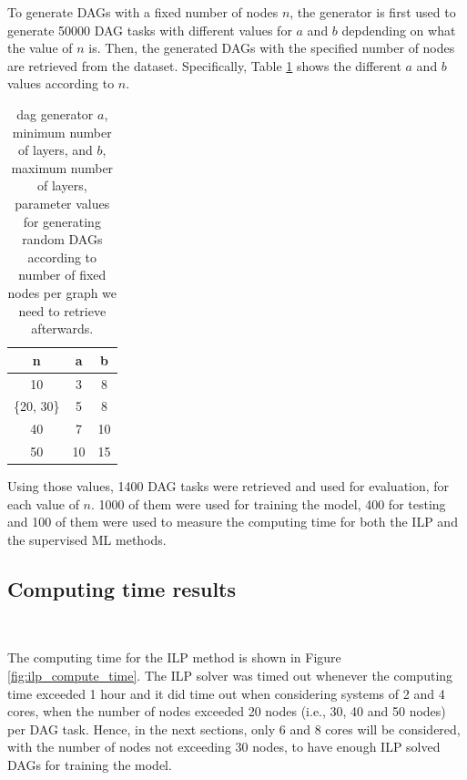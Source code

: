 To generate DAGs with a fixed number of nodes $n$, 
the generator is first used to generate 50000 DAG tasks
with different values for $a$ and $b$ depdending on what 
the value of $n$ is. Then, the generated DAGs with 
the specified number of nodes are retrieved from the dataset.
Specifically, Table \ref{tab:layer_num_minmax} 
shows the different $a$ and $b$ values according to $n$.

\begin{table}
    \centering
    \begin{tabular}{|c|c|c|}    
        \hline
        \textbf{n} & \textbf{a} & \textbf{b} \\
        \hline
        10 & 3 & 8 \\
        \hline
        \{20, 30\} & 5 & 8 \\
        \hline
        40 & 7 & 10 \\
        \hline
        50 & 10 & 15 \\
        \hline
    \end{tabular}
    \caption{dag generator $a$, minimum number of layers, and $b$, maximum
    number of layers, parameter values for generating 
    random DAGs according to number of fixed nodes per graph we need to retrieve afterwards.}
    \label{tab:layer_num_minmax}
\end{table}

Using those values, 1400 DAG tasks were retrieved and used for 
evaluation, for each value of $n$.
1000 of them were used for training the model, 400 for testing
and 100 of them were used to measure the computing time 
for both the ILP and the supervised ML methods.


\subsection{Computing time results}
~

The computing time for the ILP method is shown 
in Figure \ref{fig:ilp_compute_time}.
The ILP solver was timed out whenever the computing time exceeded 1 hour
and it did time out when considering systems of 2 and 4 cores, when the number of nodes
exceeded 20 nodes (i.e., 30, 40 and 50 nodes) per DAG task.
Hence, in the next sections, only 6 and 8 cores will be considered,
with the number of nodes not exceeding 30 nodes, to have enough
ILP solved DAGs for training the model. 

